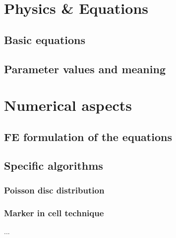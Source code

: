 \documentclass[a4paper]{article}
\begin{document}
\section{Physics \& Equations}

\subsection{Basic equations}

\subsection{Parameter values and meaning}


\section{Numerical aspects}

\subsection{FE formulation of the equations}

\subsection{Specific algorithms}


\subsubsection{Poisson disc distribution}

\subsubsection{Marker in cell technique}

...
\end{document}
